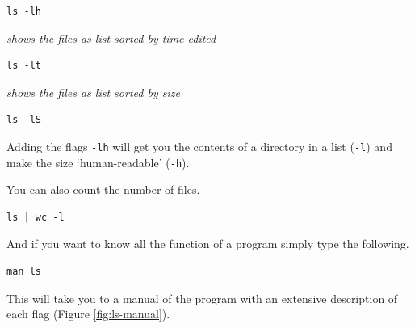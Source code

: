 \documentclass[
]{book}
\newcommand{\passthrough}[1]{#1}
\begin{document}
\begin{lstlisting}
ls -lh 
\end{lstlisting}

\emph{shows the files as list sorted by time edited}

\begin{lstlisting}
ls -lt 
\end{lstlisting}

\emph{shows the files as list sorted by size}

\begin{lstlisting}
ls -lS 
\end{lstlisting}

Adding the flags \passthrough{\lstinline!-lh!} will get you the contents of a directory in a list (\passthrough{\lstinline!-l!}) and make the size `human-readable' (\passthrough{\lstinline!-h!}).

You can also count the number of files.

\begin{lstlisting}
ls | wc -l
\end{lstlisting}

And if you want to know all the function of a program simply type the following.

\begin{lstlisting}
man ls
\end{lstlisting}

This will take you to a manual of the program with an extensive description of each flag (Figure \ref{fig:ls-manual}).
\end{document}
